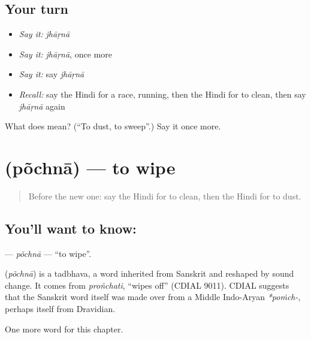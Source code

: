 \subsection*{Your turn}
\begin{itemize}
\raggedright
  \item \emph{Say it:} \emph{jhāṛnā}
  \item \emph{Say it:} \emph{jhāṛnā}, once more
  \item \emph{Say it:} say \emph{jhāṛnā}
  \item \emph{Recall:} say the Hindi for a race, running, then the Hindi for to clean, then say \emph{jhāṛnā} again
\end{itemize}

\begin{tcolorbox}[breakable,colback=teal!4,colframe=teal!35!black,title={Before you move on}]
What does  mean? (\textquotedblleft{}To dust, to sweep\textquotedblright{}.) Say it once more.
\end{tcolorbox}
\section[\texorpdfstring{\hi{पोंछना} (põchnā)}{पोंछना (põchnā)}]{ (põchnā) — to wipe}

\label{lesson:HI-C225-pochna}



\begin{quote}
Before the new one: say the Hindi for to clean, then the Hindi for to dust.
\end{quote}

\subsection*{You'll want to know: }
\textbf{} — \emph{põchnā} — \textquotedblleft{}to wipe\textquotedblright{}.

\begin{cousinweb}
\textbf{} (\emph{põchnā}) is a tadbhava, a word inherited from Sanskrit and reshaped by sound change. It comes from \emph{proñchati}, \textquotedblleft{}wipes off\textquotedblright{} (CDIAL 9011). CDIAL suggests that the Sanskrit word itself was made over from a Middle Indo-Aryan \emph{*poṁch-}, perhaps itself from Dravidian.
\end{cousinweb}

\begin{grammarlens}[title={What you've built}]
One more word for this chapter.
\end{grammarlens}

